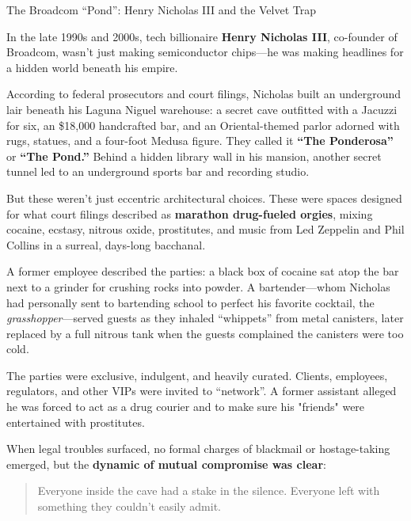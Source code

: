 \begin{HistoricalSidebar}{The Broadcom ``Pond'': Henry Nicholas III and the Velvet Trap}

  In the late 1990s and 2000s, tech billionaire \textbf{Henry Nicholas III}, co-founder of Broadcom, wasn’t just making 
  semiconductor chips—he was making headlines for a hidden world beneath his empire.

  \medskip
  
  According to federal prosecutors and court filings, Nicholas built an underground lair beneath his Laguna Niguel warehouse: 
  a secret cave outfitted with a Jacuzzi for six, an \$18{,}000 handcrafted bar, and an Oriental-themed parlor adorned 
  with rugs, statues, and a four-foot Medusa figure. They called it \textbf{“The Ponderosa”} or \textbf{“The Pond.”} 
  Behind a hidden library wall in his mansion, another secret tunnel led to an underground sports bar and recording 
  studio.

  \medskip
  
  But these weren’t just eccentric architectural choices. These were spaces designed for what court filings described as 
  \textbf{marathon drug-fueled orgies}, mixing cocaine, ecstasy, nitrous oxide, prostitutes, and music from Led Zeppelin 
  and Phil Collins in a surreal, days-long bacchanal.

  \medskip
  
  A former employee described the parties: a black box of cocaine sat atop the bar next to a grinder for crushing rocks 
  into powder. A bartender—whom Nicholas had personally sent to bartending school to perfect his favorite cocktail, the 
  \emph{grasshopper}—served guests as they inhaled “whippets” from metal canisters, later replaced by a full nitrous 
  tank when the guests complained the canisters were too cold.

  \medskip
  
  The parties were exclusive, indulgent, and heavily curated. Clients, employees, regulators, and other VIPs were invited 
  to ``network''. A former assistant alleged he was forced to act as a drug courier and to make sure his "friends" were 
  entertained with prostitutes.

  \medskip
  
  When legal troubles surfaced, no formal charges of blackmail or hostage-taking emerged, but the \textbf{dynamic of 
  mutual compromise was clear}:  

  \begin{quote}
    Everyone inside the cave had a stake in the silence.  Everyone left with something they couldn’t easily admit.  
  \end{quote}
  

\end{HistoricalSidebar}
